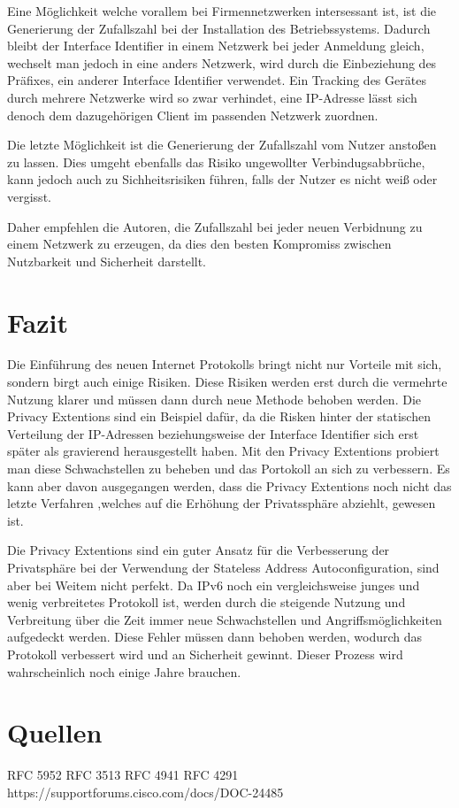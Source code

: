 \documentclass[a4paper, 12pt]{scrartcl}
\begin{document}
Eine Möglichkeit welche vorallem bei Firmennetzwerken intersessant ist, ist die Generierung der Zufallszahl bei der Installation des Betriebssystems. Dadurch bleibt der Interface Identifier in einem Netzwerk bei jeder Anmeldung gleich, wechselt man jedoch in eine anders Netzwerk, wird durch die Einbeziehung des Präfixes, ein anderer Interface Identifier verwendet. 
Ein Tracking des Gerätes durch mehrere Netzwerke wird so zwar verhindet, eine IP-Adresse lässt sich denoch dem dazugehörigen Client im passenden Netzwerk zuordnen.

Die letzte Möglichkeit ist die Generierung der Zufallszahl vom Nutzer anstoßen zu lassen. Dies umgeht ebenfalls das Risiko ungewollter Verbindugsabbrüche, kann jedoch auch zu Sichheitsrisiken führen, falls der Nutzer es nicht weiß oder vergisst.

Daher empfehlen die Autoren, die Zufallszahl bei jeder neuen Verbidnung zu einem Netzwerk zu erzeugen, da dies den besten Kompromiss zwischen Nutzbarkeit und Sicherheit darstellt.


\newpage
\section{Fazit}
Die Einführung des neuen Internet Protokolls bringt nicht nur Vorteile mit sich, sondern birgt auch einige Risiken. 
Diese Risiken werden erst durch die vermehrte Nutzung klarer und müssen dann durch neue Methode behoben werden.
Die Privacy Extentions sind ein Beispiel dafür, da die Risken hinter der statischen Verteilung der IP-Adressen beziehungsweise der Interface Identifier sich erst später als gravierend herausgestellt haben.
Mit den Privacy Extentions probiert man diese Schwachstellen zu beheben und das Portokoll an sich zu verbessern.
Es kann aber davon ausgegangen werden, dass die Privacy Extentions noch nicht das letzte Verfahren ,welches auf die Erhöhung der Privatssphäre abziehlt, gewesen ist.


Die Privacy Extentions sind ein guter Ansatz für die Verbesserung der Privatsphäre bei der Verwendung der Stateless Address Autoconfiguration, sind aber bei Weitem nicht perfekt.
Da IPv6 noch ein vergleichsweise junges und wenig verbreitetes Protokoll ist, werden durch die steigende Nutzung und Verbreitung über die Zeit immer neue Schwachstellen und Angriffsmöglichkeiten aufgedeckt werden.
Diese Fehler müssen dann behoben werden, wodurch das Protokoll verbessert wird und an Sicherheit gewinnt. Dieser Prozess wird wahrscheinlich noch einige Jahre brauchen.


\newpage

\section{Quellen}
RFC 5952
RFC 3513
RFC 4941
RFC 4291
https://supportforums.cisco.com/docs/DOC-24485
{}


\end{document}

